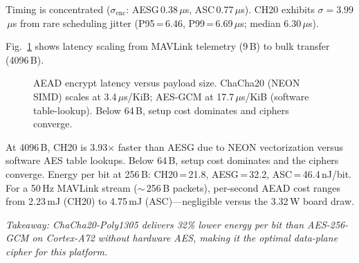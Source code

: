 Timing is concentrated ($\sigma_\text{enc}$: AESG\,0.38\,$\mu$s,
ASC\,0.77\,$\mu$s).
CH20 exhibits $\sigma = 3.99$\,$\mu$s from rare scheduling jitter
(P95\,=\,6.46, P99\,=\,6.69\,$\mu$s; median 6.30\,$\mu$s).

Fig.~\ref{fig:aead_scaling} shows latency scaling from MAVLink
telemetry (9\,B) to bulk transfer (4096\,B).

\begin{figure}[t]
\centering
{}
\caption{AEAD encrypt latency versus payload size.  ChaCha20 (NEON
  SIMD) scales at 3.4\,$\mu$s/KiB; AES-GCM at 17.7\,$\mu$s/KiB
  (software table-lookup).  Below 64\,B, setup cost dominates and
  ciphers converge.}
\label{fig:aead_scaling}
\end{figure}

At 4096\,B, CH20 is 3.93$\times$ faster than AESG due to NEON
vectorization versus software AES table lookups.  Below 64\,B,
setup cost dominates and the ciphers converge.  Energy per bit at
256\,B: CH20\,=\,21.8, AESG\,=\,32.2, ASC\,=\,46.4\,nJ/bit.
For a 50\,Hz MAVLink stream ($\sim$\,256\,B packets), per-second
AEAD cost ranges from 2.23\,mJ (CH20) to 4.75\,mJ (ASC)---negligible
versus the 3.32\,W board draw.

\emph{Takeaway: ChaCha20-Poly1305 delivers 32\% lower energy per
bit than AES-256-GCM on Cortex-A72 without hardware AES, making it
the optimal data-plane cipher for this platform.}

